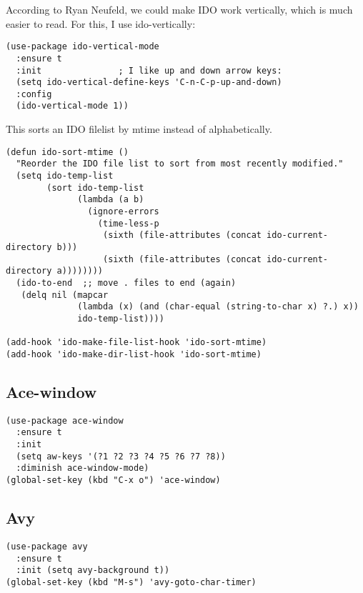 \documentclass[12pt]{article}
\begin{document}
According to Ryan Neufeld, we could make IDO work vertically, which is much easier to read. For this, I use ido-vertically:

\lstset{language=Lisp,label= ,caption= ,numbers=none}
\begin{lstlisting}
(use-package ido-vertical-mode
  :ensure t
  :init               ; I like up and down arrow keys:
  (setq ido-vertical-define-keys 'C-n-C-p-up-and-down)
  :config
  (ido-vertical-mode 1))
\end{lstlisting}

This sorts an IDO filelist by mtime instead of alphabetically.

\lstset{language=Lisp,label= ,caption= ,numbers=none}
\begin{lstlisting}
(defun ido-sort-mtime ()
  "Reorder the IDO file list to sort from most recently modified."
  (setq ido-temp-list
        (sort ido-temp-list
              (lambda (a b)
                (ignore-errors
                  (time-less-p
                   (sixth (file-attributes (concat ido-current-directory b)))
                   (sixth (file-attributes (concat ido-current-directory a))))))))
  (ido-to-end  ;; move . files to end (again)
   (delq nil (mapcar
              (lambda (x) (and (char-equal (string-to-char x) ?.) x))
              ido-temp-list))))

(add-hook 'ido-make-file-list-hook 'ido-sort-mtime)
(add-hook 'ido-make-dir-list-hook 'ido-sort-mtime)
\end{lstlisting}

\subsection{Ace-window}
\label{sec-4-3}

\lstset{language=Lisp,label= ,caption= ,numbers=none}
\begin{lstlisting}
(use-package ace-window
  :ensure t
  :init
  (setq aw-keys '(?1 ?2 ?3 ?4 ?5 ?6 ?7 ?8))
  :diminish ace-window-mode)
(global-set-key (kbd "C-x o") 'ace-window)
\end{lstlisting}

\subsection{Avy}
\label{sec-4-4}

\lstset{language=Lisp,label= ,caption= ,numbers=none}
\begin{lstlisting}
(use-package avy
  :ensure t
  :init (setq avy-background t))
(global-set-key (kbd "M-s") 'avy-goto-char-timer)
\end{lstlisting}
\end{document}
